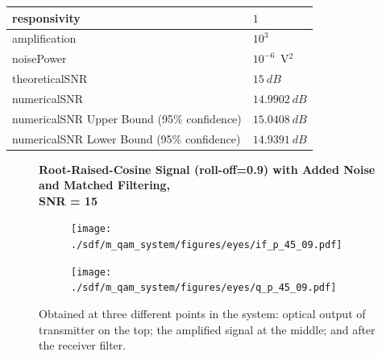 \begin{refsection}
\begin{table}[H]
\begin{tabular}{|l|l|}
		responsivity           & $1$                                                        \\ \hline
		amplification          & $10^3$                                                     \\ \hline
		noisePower   & $10^{-6}$~V$^2$                             					\\ \hline
		theoreticalSNR  	   & $15~dB$                             					\\ \hline
		numericalSNR 		     & $14.9902~dB$                             					\\ \hline
		numericalSNR Upper Bound (95\% confidence) & $15.0408~dB$                             					\\ \hline
		numericalSNR Lower Bound (95\% confidence) & $14.9391~dB$                             					\\ \hline
	\end{tabular}
\end{table}
\begin{figure}[H]
	\centering
\textbf{Root-Raised-Cosine Signal (roll-off=0.9) with Added Noise and Matched Filtering,\\SNR = 15}
\begin{minipage}{\linewidth}
	\centering
	\begin{subfigure}{.45\textwidth}
		\centering
			\texttt{[image: ./sdf/m\_qam\_system/figures/eyes/if\_p\_45\_09.pdf]}
	\end{subfigure}
	\begin{subfigure}{.45\textwidth}
		\centering
		\texttt{[image: ./sdf/m\_qam\_system/figures/eyes/q\_p\_45\_09.pdf]}
	\end{subfigure}
	
	\caption{
		Obtained at three different points in the system: optical output of transmitter on the top;
		the amplified signal at the middle; and
		after the receiver filter.
		\label{fig:eyes_n_rrc_45_09}}
	\end{minipage}
\end{figure}



\end{refsection}
